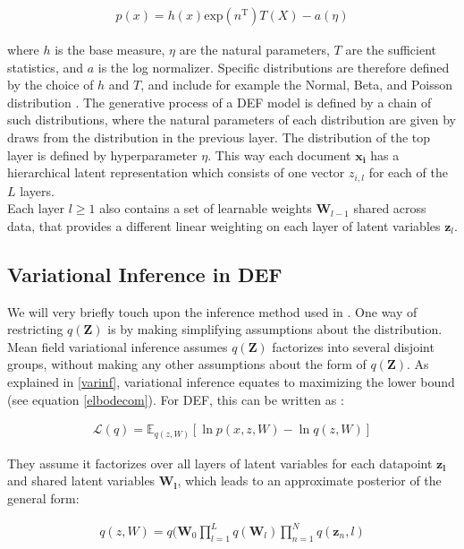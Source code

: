 \documentclass{report}
\begin{document}
\begin{align}
p(x) = h(x) \text{exp}(n^{\text{T}})T(X) - a(\eta)
\end{align}

where $h$ is the base measure, $\eta$ are the natural parameters, $T$ are the sufficient statistics, and $a$ is the log normalizer. Specific distributions are therefore defined by the choice of $h$ and $T$, and include for example the Normal, Beta, and Poisson distribution \cite{ranganath2015deep}. The generative process of a DEF model is defined by a chain of such distributions, where the natural parameters of each distribution are given by draws from the distribution in the previous layer. The distribution of the top layer is defined by hyperparameter $\eta$. This way each document $\mathbf{x_i}$ has a hierarchical latent  representation which consists of one vector $z_{i,l}$ for each of the $L$ layers. \\
Each layer $l \geq 1$ also contains a set of learnable weights $\mathbf{W}_{l-1}$ shared across data, that provides a different linear weighting on each layer of latent variables $\mathbf{z}_l$.

\subsection{Variational Inference in DEF}\label{VIDEF}
We will very briefly touch upon the inference method used in \cite{ranganath2015deep}. One way of restricting $q(\mathbf{Z})$ is by making simplifying assumptions about the distribution. Mean field variational inference \cite{bishop2006pattern} assumes $q(\mathbf{Z})$ factorizes into several disjoint groups, without making any other assumptions about the form of $q(\mathbf{Z})$. As explained in \ref{varinf}, variational inference equates to maximizing the lower bound (see equation \ref{elbodecom}). For DEF, this can be written as \cite{ranganath2015deep}: 

\begin{align}\label{elbodef}
\mathcal{L}(q) = \mathbb{E}_{q(z,W)}[\ln p(x,z,W) - \ln q(z,W)]
\end{align}

They assume it factorizes over all layers of latent variables for each datapoint $\mathbf{z_l}$ and shared latent variables $\mathbf{W_l}$, which leads to an approximate posterior of the general form:

\begin{align}
q(z,W) = q(\mathbf{W}_0 \prod_{l=1}^Lq(\mathbf{W}_l)\prod_{n=1}^{N}q(\mathbf{z}_n,l)
\end{align}
\end{document}
